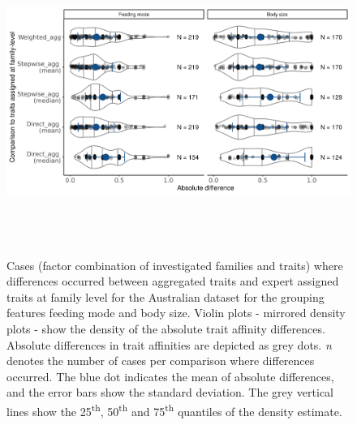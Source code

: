 \documentclass{article}
\begin{document}
\begin{figure}[H]
  \centering
  \includegraphics[width=16.5cm, height=10cm]{Deviances_trait_agg_chessman.png}
  \caption{Cases (factor combination of investigated families and traits) where differences occurred between aggregated traits and expert assigned traits at family level for the Australian dataset for the grouping features feeding mode and body size. Violin plots - mirrored density plots - show
  the density of the absolute trait affinity differences. Absolute differences in trait affinities are depicted as grey dots. \textit{n} denotes the number of cases per comparison where differences occurred. The blue dot indicates the mean of absolute differences, and the error bars show the standard deviation. The grey vertical lines show the 25\textsuperscript{th}, 50\textsuperscript{th} and 75\textsuperscript{th} quantiles of the density estimate.}
  \label{fig:diff_aggr_traits_chessman}
\end{figure}
\end{document}
